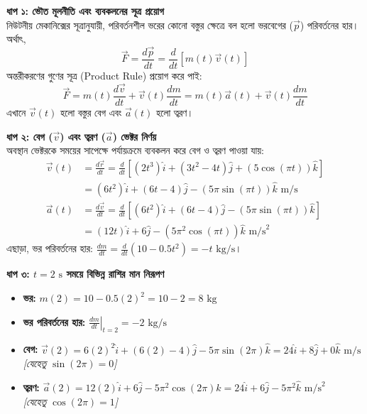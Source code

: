 \documentclass[12pt, a4paper]{article}
\begin{document}
\begin{tcolorbox}[solutionbox={সমাধান (Solution)}]
\noindent
\textbf{ধাপ ১: ভৌত মূলনীতি এবং ব্যবকলনের সূত্র প্রয়োগ} \\
নিউটনীয় মেকানিক্সের সূত্রানুযায়ী, পরিবর্তনশীল ভরের কোনো বস্তুর ক্ষেত্রে বল হলো ভরবেগের ($\vec{p}$) পরিবর্তনের হার। অর্থাৎ,
\[ \vec{F} = \frac{d\vec{p}}{dt} = \frac{d}{dt}\left[m(t)\vec{v}(t)\right] \]
অন্তরীকরণের গুণের সূত্র (Product Rule) প্রয়োগ করে পাই:
\[ \vec{F} = m(t)\frac{d\vec{v}}{dt} + \vec{v}(t)\frac{dm}{dt} = m(t)\vec{a}(t) + \vec{v}(t)\frac{dm}{dt} \]
এখানে $\vec{v}(t)$ হলো বস্তুর বেগ এবং $\vec{a}(t)$ হলো ত্বরণ।

\vspace{1em}
\noindent
\textbf{ধাপ ২: বেগ ($\vec{v}$) এবং ত্বরণ ($\vec{a}$) ভেক্টর নির্ণয়} \\
অবস্থান ভেক্টরকে সময়ের সাপেক্ষে পর্যায়ক্রমে ব্যবকলন করে বেগ ও ত্বরণ পাওয়া যায়:
\begin{align*}
\vec{v}(t) &= \frac{d\vec{r}}{dt} = \frac{d}{dt} \left[ (2t^3)\hat{i} + (3t^2 - 4t)\hat{j} + (5\cos(\pi t))\hat{k} \right] \\
           &= (6t^2)\hat{i} + (6t - 4)\hat{j} - (5\pi\sin(\pi t))\hat{k} \text{ m/s} \\[1ex]
\vec{a}(t) &= \frac{d\vec{v}}{dt} = \frac{d}{dt} \left[ (6t^2)\hat{i} + (6t - 4)\hat{j} - (5\pi\sin(\pi t))\hat{k} \right] \\
           &= (12t)\hat{i} + 6\hat{j} - (5\pi^2\cos(\pi t))\hat{k} \text{ m/s}^2
\end{align*}
এছাড়া, ভর পরিবর্তনের হার: $\frac{dm}{dt} = \frac{d}{dt}(10 - 0.5t^2) = -t \text{ kg/s}$।

\vspace{1em}
\noindent
\textbf{ধাপ ৩: $t = 2\text{ s}$ সময়ে বিভিন্ন রাশির মান নিরূপণ}
\begin{itemize}[leftmargin=*, parsep=0.5ex]
    \item \textbf{ভর:} $m(2) = 10 - 0.5(2)^2 = 10 - 2 = 8 \text{ kg}$
    \item \textbf{ভর পরিবর্তনের হার:} $\left.\frac{dm}{dt}\right|_{t=2} = -2 \text{ kg/s}$
    \item \textbf{বেগ:} $\vec{v}(2) = 6(2)^2\hat{i} + (6(2) - 4)\hat{j} - 5\pi\sin(2\pi)\hat{k} = 24\hat{i} + 8\hat{j} + 0\hat{k} \text{ m/s}$ \\ \textit{[যেহেতু $\sin(2\pi) = 0$]}
    \item \textbf{ত্বরণ:} $\vec{a}(2) = 12(2)\hat{i} + 6\hat{j} - 5\pi^2\cos(2\pi)\hat{k} = 24\hat{i} + 6\hat{j} - 5\pi^2\hat{k} \text{ m/s}^2$ \\ \textit{[যেহেতু $\cos(2\pi) = 1$]}
\end{itemize}


\end{tcolorbox}
\end{document}
